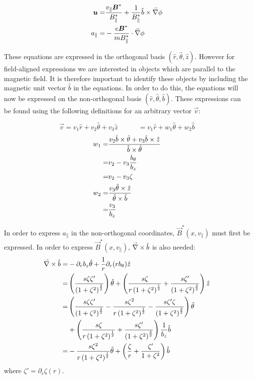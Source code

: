 \begin{align}
 \boldsymbol{u} =& \frac{v_\parallel\boldsymbol{B}^*}{B_\parallel^*} + \frac{1}{B_\parallel^*} \hat{b}\times\accentset{\rightharpoonup}{\nabla}\phi\\
 a_\parallel =& - \frac{e\boldsymbol{B}^*}{mB_\parallel^*}\cdot\accentset{\rightharpoonup}{\nabla}\phi
\end{align}

These equations are expressed in the orthogonal basis $(\hat{r},\hat{\theta},\hat{z})$. However for field-aligned expressions we are interested in objects which are parallel to the magnetic field. It is therefore important to identify these objects by including the magnetic unit vector $\hat{b}$ in the equations. In order to do this, the equations will now be expressed on the non-orthogonal basis $(\hat{r},\hat{\theta},\hat{b})$. These expressions can be found using the following definitions for an arbitrary vector $\vec{v}$:

\begin{equation*}
 \vec{v}=v_1\hat{r} + v_2\hat{\theta} + v_3\hat{z} \quad \quad \quad = v_1 \hat{r} + w_1\hat{\theta} + w_2\hat{b}
\end{equation*}
\vspace{-1.5em}
\begin{align*}
 w_1 =& \frac{v_2\hat{b}\times\hat{\theta} + v_3\hat{b}\times\hat{z}}{\hat{b}\times\hat{\theta}}\\
 =& v_2 - v_3 \frac{b_\theta}{b_z}\\
 =& v_2 - v_3 \zeta\\
 w_2 =& \frac{v_3\hat{\theta}\times\hat{z}}{\hat{\theta}\times\hat{b}}\\
 =& \frac{v_3}{b_z}
\end{align*}

In order to express $a_\parallel$ in the non-orthogonal coordinates, $\vec{B}^*(x,v_\parallel)$ must first be expressed. In order to express $\vec{B}^*(x,v_\parallel)$, $\accentset{\rightharpoonup}{\nabla}\times\hat{b}$ is also needed:
\begin{align*}
 \accentset{\rightharpoonup}{\nabla}\times\hat{b} =& -\partial_rb_z\hat{\theta}+\frac{1}{r}\partial_r(rb_\theta)\hat{z}\\
 =& \left(\frac{s\zeta \zeta'}{\left(1+\zeta^2\right)^{\frac{3}{2}}}\right)\hat{\theta} + \left(\frac{s\zeta}{r\left(1+\zeta^2\right)^{\frac{1}{2}}} + \frac{s\zeta'}{\left(1+\zeta^2\right)^{\frac{3}{2}}}\right)\hat{z}\\
 =& \left(\frac{s\zeta \zeta'}{\left(1+\zeta^2\right)^{\frac{3}{2}}} - \frac{s\zeta^2}{r\left(1+\zeta^2\right)^{\frac{1}{2}}} - \frac{s\zeta'\zeta}{\left(1+\zeta^2\right)^{\frac{3}{2}}}\right)\hat{\theta}\\
 &+ \left(\frac{s\zeta}{r\left(1+\zeta^2\right)^{\frac{1}{2}}} + \frac{s\zeta'}{\left(1+\zeta^2\right)^{\frac{3}{2}}}\right)\frac{1}{b_z}\hat{b}\\
 =& - \frac{s\zeta^2}{r\left(1+\zeta^2\right)^{\frac{1}{2}}} \hat{\theta} + \left(\frac{\zeta}{r} + \frac{\zeta'}{1+\zeta^2}\right)\hat{b}
\end{align*}
where $\zeta'=\partial_r\zeta(r)$.

